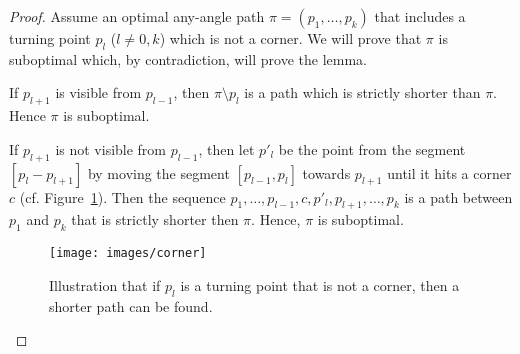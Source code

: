 \begin{proof}
{
  Assume an optimal any-angle path $\pi = (p_1,\dots,p_k)$ 
  that includes a turning point $p_l$ ($l \neq 0,k$) 
  which is not a corner.  
  We will prove that $\pi$ is suboptimal 
  which, by contradiction, will prove the lemma.  
  
  If $p_{l+1}$ is visible from $p_{l-1}$, 
  then  $\pi \setminus p_l$ is a path 
  which is strictly shorter than $\pi$.  
  Hence $\pi$ is suboptimal.  

  If $p_{l+1}$ is not visible from $p_{l-1}$, 
  then let $p'_l$ be the point from the segment $[p_l-p_{l+1}]$ 
  by moving the segment $[p_{l-1},p_{l}]$ towards $p_{l+1}$ 
  until it hits a corner $c$ (cf. Figure~\ref{fig::corner}).  
  Then the sequence $p_1,\dots,p_{l-1},c,p'_l,p_{l+1},\dots,p_k$ 
  is a path between $p_1$ and $p_k$ 
  that is strictly shorter then $\pi$.  
  Hence, $\pi$ is suboptimal.  
}

\begin{figure}[ht]
  \begin{center}
    \texttt{[image: images/corner]}
  \end{center}
  \caption{Illustration that 
    if $p_l$ is a turning point that is not a corner, 
    then a shorter path can be found.}
  \label{fig::corner}
\end{figure}
\end{proof}

